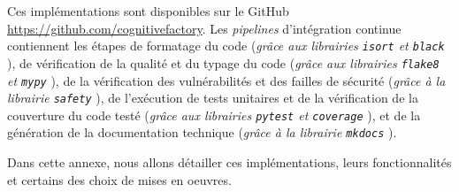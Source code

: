 	\setcounter{localCounterOfFootnoteValue}{\value{footnote}}
	\begin{leftBarInformation}
		Ces implémentations sont disponibles sur le GitHub \url{https://github.com/cognitivefactory}.
		Les \textit{pipelines} d'intégration continue contiennent les étapes
		de formatage du code (\textit{grâce aux librairies \texttt{isort} \footnotemark et \texttt{black} \footnotemark}),
		de vérification de la qualité et du typage du code (\textit{grâce aux librairies \texttt{flake8} \footnotemark et \texttt{mypy} \footnotemark}),
		de la vérification des vulnérabilités et des failles de sécurité (\textit{grâce à la librairie \texttt{safety} \footnotemark}),
		de l'exécution de tests unitaires et de la vérification de la couverture du code testé (\textit{grâce aux librairies \texttt{pytest} \footnotemark et \texttt{coverage} \footnotemark}),
		et de la génération de la documentation technique (\textit{grâce à la librairie \texttt{mkdocs} \footnotemark}).
	\end{leftBarInformation}
	
	Dans cette annexe, nous allons détailler ces implémentations, leurs fonctionnalités et certains des choix de mises en oeuvres.
	
